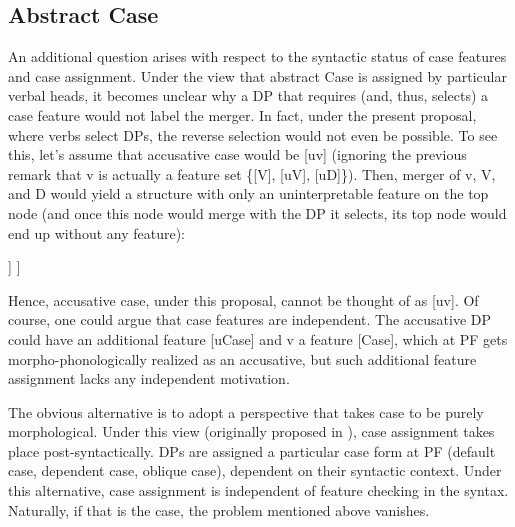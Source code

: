\documentclass[output=paper
,modfonts
,nonflat]{langsci/langscibook}
\begin{document}
\subsection{Abstract Case}
An additional question arises with respect to the syntactic status of case features and case assignment. Under the view that abstract Case is assigned by particular verbal heads, it becomes unclear why a DP that requires (and, thus, selects) a case feature would not label the merger. In fact, under the present proposal, where verbs select DPs, the reverse selection would not even be possible. To see this, let’s assume that accusative case would be [uv] (ignoring the previous remark that v is actually a feature set \{[V], [uV], [uD]\}). Then, merger of v, V, and D would yield a structure with only an uninterpretable feature on the top node (and once this node would merge with the DP it selects, its top node would end up without any feature):

	\begin{exe}
    \ex
			\begin{forest}	
				[v'{=}\{{[}uD{]}\}
				[v{=}\{{[}v{]}{,} {[}uV{]}{,} {[}uD{]}\}]
				[VP{=}\{{[}V{]}{,} {[}uv{]}\}
				[V{=}\{{[}V{]}{,} {[}uD{]}\}]
				[DP{=}\{{[}D{]}{,} {[}uv{]}\}]
				] ] 
		\end{forest}
	\end{exe}

\noindent Hence, accusative case, under this proposal, cannot be thought of as [uv]. Of course, one could argue that case features are independent. The accusative DP could have an additional feature [uCase] and v a feature [Case], which at PF gets morpho-phonologically realized as an accusative, but such additional feature assignment lacks any independent motivation.

The obvious alternative is to adopt a perspective that takes case to be purely morphological. Under this view (originally proposed in \citealt{Marantz1991}), case assignment takes place post-syntactically. DPs are assigned a particular case form at PF (default case, dependent case, oblique case), dependent on their syntactic context. Under this alternative, case assignment is independent of feature checking in the syntax. Naturally, if that is the case, the problem mentioned above vanishes.
\end{document}
